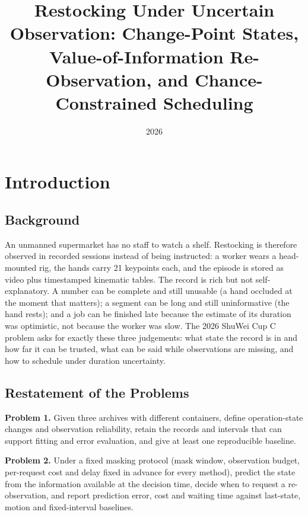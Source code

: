 \documentclass{swmcmthesis}
\title{Restocking Under Uncertain Observation: Change-Point States, Value-of-Information Re-Observation, and Chance-Constrained Scheduling}
\date{2026}
\begin{document}
\lstset{upquote=true}
\maketitle
{}
\tableofcontents
\thispagestyle{empty}
\newpage

\section{Introduction}
\subsection{Background}
An unmanned supermarket has no staff to watch a shelf. Restocking is therefore observed in recorded sessions instead of being instructed: a worker wears a head-mounted rig, the hands carry 21 keypoints each, and the episode is stored as video plus timestamped kinematic tables. The record is rich but not self-explanatory. A number can be complete and still unusable (a hand occluded at the moment that matters); a segment can be long and still uninformative (the hand rests); and a job can be finished late because the estimate of its duration was optimistic, not because the worker was slow. The 2026 ShuWei Cup C problem asks for exactly these three judgements: what state the record is in and how far it can be trusted, what can be said while observations are missing, and how to schedule under duration uncertainty.

\subsection{Restatement of the Problems}
\textbf{Problem 1.} Given three archives with different containers, define operation-state changes and observation reliability, retain the records and intervals that can support fitting and error evaluation, and give at least one reproducible baseline.

\textbf{Problem 2.} Under a fixed masking protocol (mask window, observation budget, per-request cost and delay fixed in advance for every method), predict the state from the information available at the decision time, decide when to request a re-observation, and report prediction error, cost and waiting time against last-state, motion and fixed-interval baselines.
\end{document}
